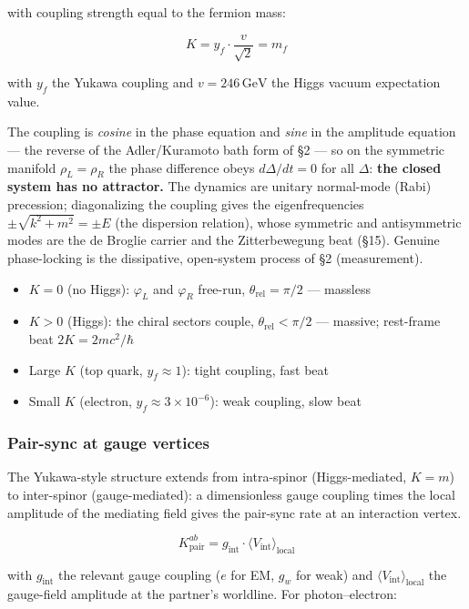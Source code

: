 \documentclass[
]{article}
\providecommand{\tightlist}{%
  \setlength{\itemsep}{0pt}\setlength{\parskip}{0pt}}
\begin{document}
with coupling strength equal to the fermion mass:

\[\boxed{K = y_f \cdot \frac{v}{\sqrt{2}} = m_f}\]

with \(y_f\) the Yukawa coupling and \(v = 246\,\text{GeV}\) the Higgs
vacuum expectation value.

The coupling is \emph{cosine} in the phase equation and \emph{sine} in
the amplitude equation --- the reverse of the Adler/Kuramoto bath form
of §2 --- so on the symmetric manifold \(\rho_L = \rho_R\) the phase
difference obeys \(d\Delta/dt = 0\) for all \(\Delta\): \textbf{the
closed system has no attractor.} The dynamics are unitary normal-mode
(Rabi) precession; diagonalizing the coupling gives the eigenfrequencies
\(\pm\sqrt{k^2+m^2} = \pm E\) (the dispersion relation), whose symmetric
and antisymmetric modes are the de Broglie carrier and the
Zitterbewegung beat (§15). Genuine phase-locking is the dissipative,
open-system process of §2 (measurement).

\begin{itemize}
\tightlist
\item
  \(K = 0\) (no Higgs): \(\varphi_L\) and \(\varphi_R\) free-run,
  \(\theta_{\text{rel}} = \pi/2\) --- massless
\item
  \(K > 0\) (Higgs): the chiral sectors couple,
  \(\theta_{\text{rel}} < \pi/2\) --- massive; rest-frame beat
  \(2K = 2mc^2/\hbar\)
\item
  Large \(K\) (top quark, \(y_f \approx 1\)): tight coupling, fast beat
\item
  Small \(K\) (electron, \(y_f \approx 3 \times 10^{-6}\)): weak
  coupling, slow beat
\end{itemize}

\subsubsection{Pair-sync at gauge
vertices}\label{pair-sync-at-gauge-vertices}

The Yukawa-style structure extends from intra-spinor (Higgs-mediated,
\(K = m\)) to inter-spinor (gauge-mediated): a dimensionless gauge
coupling times the local amplitude of the mediating field gives the
pair-sync rate at an interaction vertex.

\[\boxed{K_{\text{pair}}^{ab} = g_{\text{int}} \cdot \langle V_{\text{int}} \rangle_{\text{local}}}\]

with \(g_{\text{int}}\) the relevant gauge coupling (\(e\) for EM,
\(g_w\) for weak) and \(\langle V_{\text{int}} \rangle_{\text{local}}\)
the gauge-field amplitude at the partner's worldline. For
photon--electron:
\end{document}
